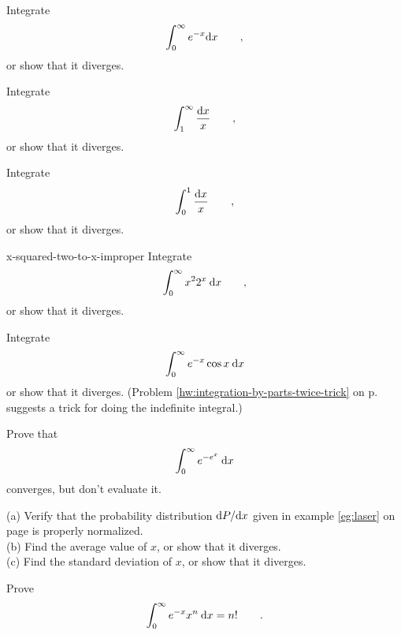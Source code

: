\begin{hwsection}

\begin{hw}
Integrate
\begin{equation*}
  \int_0^\infty e^{-x} \textup{d} x \qquad ,
\end{equation*}
or show that it diverges.
\end{hw}

\begin{hw}
Integrate
\begin{equation*}
  \int_1^\infty \frac{\textup{d} x}{x} \qquad ,
\end{equation*}
or show that it diverges.
\end{hw}

\begin{hw}
Integrate
\begin{equation*}
  \int_0^1 \frac{\textup{d} x}{x} \qquad ,
\end{equation*}
or show that it diverges.
\end{hw}

\begin{hwwithsoln}{x-squared-two-to-x-improper}
Integrate
\begin{equation*}
  \int_0^\infty x^2 2^x \:\textup{d} x \qquad ,
\end{equation*}
or show that it diverges.
\end{hwwithsoln}

\begin{hw}
Integrate
\begin{equation*}
  \int_0^\infty e^{-x}\cos x \: \textup{d} x
\end{equation*}
or show that it diverges. (Problem \ref{hw:integration-by-parts-twice-trick} on p.~\pageref{hw:integration-by-parts-twice-trick} suggests
a trick for doing the indefinite integral.)
\end{hw}

\begin{hw}
Prove that
\begin{equation*}
  \int_0^\infty e^{-e^x} \: \textup{d} x
\end{equation*}
converges, but don't evaluate it.
\end{hw}

\begin{hw}\label{hw:laser}
(a) Verify that the probability distribution $\textup{d} P/\textup{d} x$ given in example \ref{eg:laser} on page \pageref{eg:laser}
is properly normalized.\\
(b) Find the average value of $x$, or show that it diverges.\\
(c) Find the standard deviation of $x$, or show that it diverges.
\end{hw}

\begin{hw}[2]
Prove
\begin{equation*}
  \int_0^\infty e^{-x}x^n\:\textup{d} x = n! \qquad .
\end{equation*}
\end{hw}

\end{hwsection}
